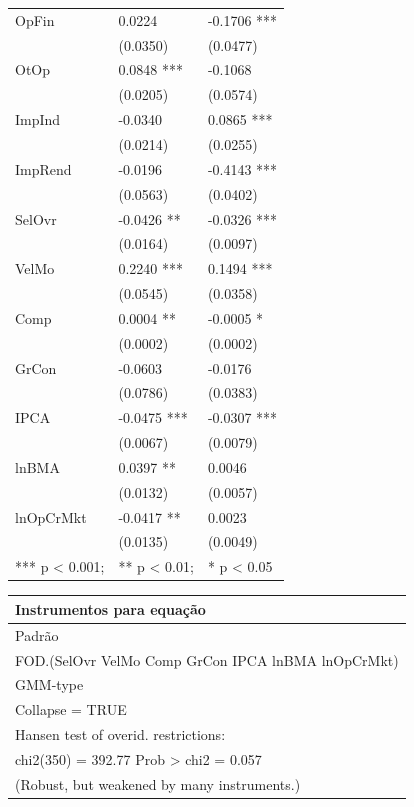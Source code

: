 \documentclass[
  12pt,
  12pt,
  openright,
  oneside,
  a4paper,
  chapter=TITLE,
  section=TITLE,
  subsection=TITLE,
  subsubsection=TITLE,
  english,
  portugues,
  sumario=tradicional]{abntex2}
\begin{document}
\begin{longtable}[]{@{}lll@{}}
OpFin & 0.0224 & -0.1706 *** \\
& (0.0350) & (0.0477) \\
OtOp & 0.0848 *** & -0.1068 \\
& (0.0205) & (0.0574) \\
ImpInd & -0.0340 & 0.0865 *** \\
& (0.0214) & (0.0255) \\
ImpRend & -0.0196 & -0.4143 *** \\
& (0.0563) & (0.0402) \\
SelOvr & -0.0426 ** & -0.0326 *** \\
& (0.0164) & (0.0097) \\
VelMo & 0.2240 *** & 0.1494 *** \\
& (0.0545) & (0.0358) \\
Comp & 0.0004 ** & -0.0005 * \\
& (0.0002) & (0.0002) \\
GrCon & -0.0603 & -0.0176 \\
& (0.0786) & (0.0383) \\
IPCA & -0.0475 *** & -0.0307 *** \\
& (0.0067) & (0.0079) \\
lnBMA & 0.0397 ** & 0.0046 \\
& (0.0132) & (0.0057) \\
lnOpCrMkt & -0.0417 ** & 0.0023 \\
& (0.0135) & (0.0049) \\
*** p \textless{} 0.001; & ** p \textless{} 0.01; & * p \textless{} 0.05 \\
\bottomrule
\end{longtable}

\begin{longtable}[]{@{}l@{}}
\toprule
Instrumentos para equação \\
\midrule
\endhead
Padrão \\
FOD.(SelOvr VelMo Comp GrCon IPCA lnBMA lnOpCrMkt) \\
GMM-type \\
Collapse = TRUE \\
Hansen test of overid. restrictions: \\
chi2(350) = 392.77 Prob \textgreater{} chi2 = 0.057 \\
(Robust, but weakened by many instruments.) \\
\bottomrule
\end{longtable}

\vspace{1mm}
\end{document}
